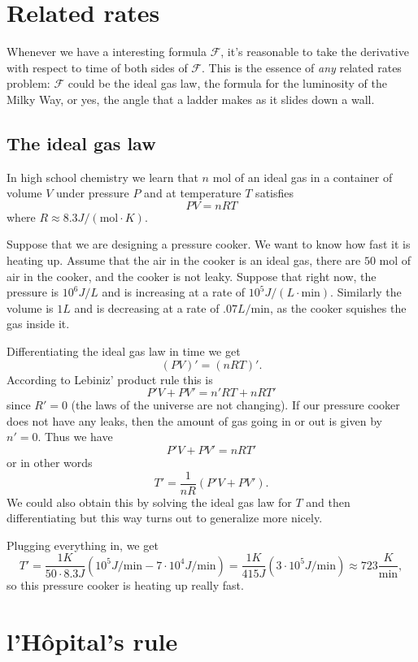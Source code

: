 \documentclass[reqno,12pt,letterpaper]{amsart}
\theoremstyle{definition}
\numberwithin{equation}{section}
\begin{document}
\section{Related rates}
Whenever we have a interesting formula $\mathscr F$, it's reasonable to take the derivative with respect to time of both sides of $\mathscr F$.
This is the essence of \emph{any} related rates problem: $\mathscr F$ could be the ideal gas law, the formula for the luminosity of the Milky Way, or yes, the angle that a ladder makes as it slides down a wall.

\subsection{The ideal gas law}
In high school chemistry we learn that $n$ mol of an ideal gas in a container of volume $V$ under pressure $P$ and at temperature $T$ satisfies
$$PV = nRT$$
where $R \approx 8.3 J/(\text{mol}\cdot K)$.

Suppose that we are designing a pressure cooker. We want to know how fast it is heating up.
Assume that the air in the cooker is an ideal gas, there are $50$ mol of air in the cooker, and the cooker is not leaky.
Suppose that right now, the pressure is $10^6 J/L$ and is increasing at a rate of $10^5 J/(L \cdot \text{min})$.
Similarly the volume is $1 L$ and is decreasing at a rate of $.07 L/\text{min}$, as the cooker squishes the gas inside it.

Differentiating the ideal gas law in time we get
$$(PV)' = (nRT)'.$$
According to Lebiniz' product rule this is
$$P'V + PV' = n'RT + nRT'$$
since $R' = 0$ (the laws of the universe are not changing).
If our pressure cooker does not have any leaks, then the amount of gas going in or out is given by $n' = 0$.
Thus we have
$$P'V + PV' = nRT'$$
or in other words
$$T' = \frac{1}{nR}(P'V + PV').$$
We could also obtain this by solving the ideal gas law for $T$ and then differentiating but this way turns out to generalize more nicely.

Plugging everything in, we get
$$T' = \frac{1 K}{50 \cdot 8.3 J}(10^5 J/\text{min} -7 \cdot 10^4 J/\text{min}) = \frac{1 K}{415 J}(3 \cdot 10^5 J/\text{min}) \approx 723 \frac{K}{\text{min}},$$
so this pressure cooker is heating up really fast.

\section{l'H\^opital's rule}
\end{document}
